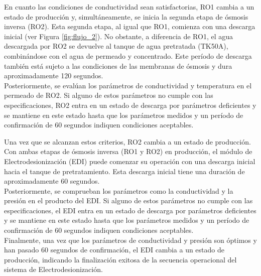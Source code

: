 

En cuanto las condiciones de conductividad sean satisfactorias, RO1 cambia a un estado de producción
y, simultáneamente, se inicia la segunda etapa de ósmosis inversa (RO2). Esta segunda etapa, al
igual que RO1, comienza con una descarga inicial (ver Figura \ref{fig:flujo_2}). No obstante, a diferencia de RO1, el agua
descargada por RO2 se devuelve al tanque de agua pretratada (TK50A), combinándose con el agua
de permeado y concentrado. Este período de descarga también está sujeto a las condiciones de
las membranas de ósmosis y dura aproximadamente 120 segundos.\\

Posteriormente, se evalúan los parámetros de conductividad y temperatura en el permeado de RO2.
Si alguno de estos parámetros no cumple con las especificaciones, RO2 entra en un estado de descarga
por parámetros deficientes y se mantiene en este estado hasta que los parámetros medidos y un período
de confirmación de 60 segundos indiquen condiciones aceptables.\\



Una vez que se alcanzan estos criterios, RO2 cambia a un estado de producción. Con ambas etapas de
ósmosis inversa (RO1 y RO2) en producción, el módulo de Electrodesionización (EDI) puede comenzar su
operación con una descarga inicial hacia el tanque de pretratamiento. Esta descarga inicial tiene
una duración de aproximadamente 60 segundos.\\

Posteriormente, se comprueban los parámetros como la conductividad y la presión en el producto del EDI.
Si alguno de estos parámetros no cumple con las especificaciones, el EDI entra en un estado de descarga
por parámetros deficientes y se mantiene en este estado hasta que los parámetros medidos y un período
de confirmación de 60 segundos indiquen condiciones aceptables.\\

Finalmente, una vez que los parámetros de conductividad y presión son óptimos y han pasado 60 segundos
de confirmación, el EDI cambia a un estado de producción, indicando la finalización exitosa de la
secuencia operacional del sistema de Electrodesionización.\\

